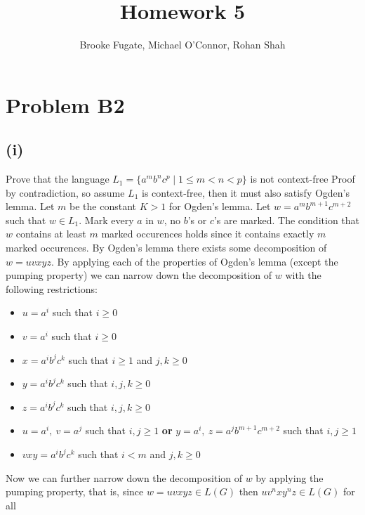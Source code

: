 \documentclass[12pt]{article}
\begin{document}
\pagestyle{plain}
\titleformat{\subsection}[runin]
  {\normalfont\large\bfseries}{\thesubsection}{1em}{}

\title{Homework 5}
\author{Brooke Fugate, Michael O'Connor, Rohan Shah}
\date{}

\maketitle

\section*{Problem B2}
\subsection*{(i)} Prove that the language $L_1 = \{a^mb^nc^p \mid 1\le m<n<p\}$
is not context-free
\medskip \newline
Proof by contradiction, so assume $L_1$ is context-free, then it must also
satisfy Ogden's lemma. Let $m$ be the constant $K > 1$ for Ogden's lemma.
Let $w = a^mb^{m+1}c^{m+2}$ such that $w \in L_1$. Mark every $a$ in $w$,
no $b$'s or $c$'s are marked. The condition that $w$ contains at least $m$
marked occurences holds since it contains exactly $m$ marked occurences.
By Ogden's lemma there exists some decomposition of $w = uvxyz$. By applying
each of the properties of Ogden's lemma (except the pumping property) we can
narrow down the decomposition of $w$ with the following restrictions:
\begin{itemize}
\item $u=a^i$ such that $i\ge 0$
\item $v=a^i$ such that $i\ge 0$
\item $x=a^ib^jc^k$ such that $i\ge 1$ and $j,k\ge 0$
\item $y=a^ib^jc^k$ such that $i,j,k\ge 0$
\item $z=a^ib^jc^k$ such that $i,j,k\ge 0$
\item $u=a^i,\ v=a^j$ such that $i,j\ge 1$ \textbf{or}
$y=a^i,\ z=a^jb^{m+1}c^{m+2}$ such that $i,j\ge 1$
\item $vxy = a^ib^jc^k$ such that $i<m$ and $j,k\ge 0$
\end{itemize}
Now we can further narrow down the decomposition of $w$ by applying the pumping
property, that is, since $w = uvxyz \in L(G)$ then $uv^nxy^nz \in L(G)$ for all
\end{document}
